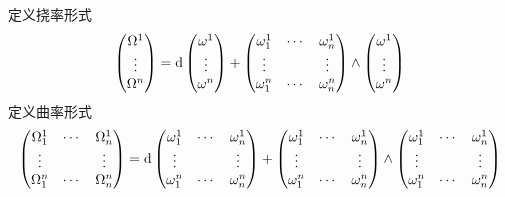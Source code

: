 \documentclass{book}
\newcommand{\md}{{\rm d}}
\begin{document}
            定义挠率形式
            \begin{equation}\label{df:torsion-form}
                \begin{pmatrix}
                    \Omega^1 \\ \vdots \\ \Omega^n
                \end{pmatrix} = 
                \md\begin{pmatrix}
                    \omega^1 \\ \vdots \\ \omega^n
                \end{pmatrix} + 
                \begin{pmatrix}
                    \omega^1_1 & \cdots & \omega^1_n \\
                    \vdots & & \vdots \\
                    \omega^n_1 & \cdots & \omega^n_n
                \end{pmatrix}\wedge
                \begin{pmatrix}
                    \omega^1 \\ \vdots \\ \omega^n
                \end{pmatrix}
            \end{equation}
            定义曲率形式
            \begin{equation}\label{df:curvature-form}
                \begin{pmatrix}
                    \Omega^1_1 & \cdots & \Omega^1_n \\ 
                    \vdots & & \vdots \\ 
                    \Omega^n_1 & \cdots & \Omega^n_n
                \end{pmatrix} = 
                \md\begin{pmatrix}
                    \omega^1_1 & \cdots & \omega^1_n \\
                    \vdots & & \vdots \\
                    \omega^n_1 & \cdots & \omega^n_n
                \end{pmatrix} + 
                \begin{pmatrix}
                    \omega^1_1 & \cdots & \omega^1_n \\
                    \vdots & & \vdots \\
                    \omega^n_1 & \cdots & \omega^n_n
                \end{pmatrix}\wedge
                \begin{pmatrix}
                    \omega^1_1 & \cdots & \omega^1_n \\
                    \vdots & & \vdots \\
                    \omega^n_1 & \cdots & \omega^n_n
                \end{pmatrix}
            \end{equation}
\end{document}
